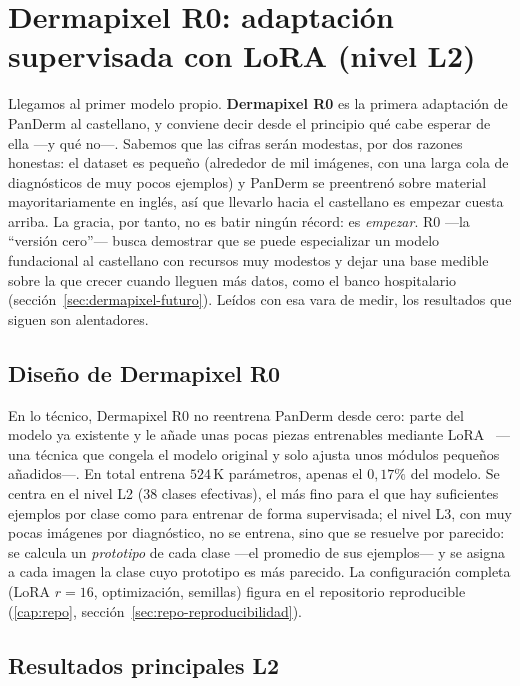 \section{Dermapixel R0: adaptación supervisada con LoRA (nivel L2)}
\label{sec:dermapixel-spanderm-v0}

Llegamos al primer modelo propio.
\textbf{Dermapixel R0} es la primera adaptación de PanDerm al
castellano, y conviene decir desde el principio qué cabe esperar de
ella ---y qué no---. Sabemos que las cifras serán modestas, por dos
razones honestas: el dataset es pequeño (alrededor de mil imágenes, con
una larga cola de diagnósticos de muy pocos ejemplos) y PanDerm se
preentrenó sobre material mayoritariamente en inglés, así que llevarlo
hacia el castellano es empezar cuesta arriba. La gracia, por tanto, no
es batir ningún récord: es \emph{empezar}. R0 ---la ``versión cero''---
busca demostrar que se puede especializar un modelo fundacional al
castellano con recursos muy modestos y dejar una base medible sobre la
que crecer cuando lleguen más datos, como el banco hospitalario
(sección~\ref{sec:dermapixel-futuro}). Leídos con esa vara de medir,
los resultados que siguen son alentadores.

\subsection{Diseño de Dermapixel R0}

En lo técnico, Dermapixel R0 no reentrena PanDerm desde cero: parte del
modelo ya existente y le añade unas pocas piezas entrenables mediante
LoRA~\cite{lora} ---una técnica que congela el modelo original y solo
ajusta unos módulos pequeños añadidos---. En total entrena $524$\,K
parámetros, apenas el $0{,}17\%$ del modelo. Se centra en el nivel L2
($38$ clases efectivas), el más fino para el que hay suficientes ejemplos
por clase como para entrenar de forma supervisada; el nivel L3, con muy
pocas imágenes por diagnóstico, no se entrena, sino que se resuelve por
parecido: se calcula un \emph{prototipo} de cada clase ---el promedio de
sus ejemplos--- y se asigna a cada imagen la clase cuyo prototipo es más
parecido. La configuración completa (LoRA $r=16$, optimización,
semillas) figura en el repositorio reproducible (\ref{cap:repo},
sección~\ref{sec:repo-reproducibilidad}).

\subsection{Resultados principales L2}

